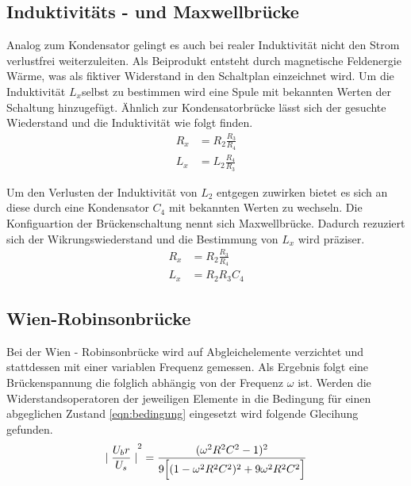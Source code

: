 \subsection{Induktivitäts - und Maxwellbrücke }
Analog zum Kondensator gelingt es auch bei realer Induktivität nicht den Strom verlustfrei weiterzuleiten.
Als Beiprodukt entsteht durch magnetische Feldenergie Wärme, was als fiktiver Widerstand in den Schaltplan einzeichnet wird.
Um die Induktivität $L_x$selbst zu bestimmen wird eine Spule mit bekannten Werten der Schaltung hinzugefügt. 
Ähnlich zur Kondensatorbrücke lässt sich der gesuchte Wiederstand und die Induktivität wie folgt finden.
\begin{align}
    R_x &= R_2\frac{R_3}{R_4} \\
    L_x &= L_2\frac{R_4}{R_3}
\end{align}

Um den Verlusten der Induktivität von $L_2$ entgegen zuwirken bietet es sich an diese durch eine Kondensator $C_4$ mit bekannten Werten
zu wechseln. Die Konfiguartion der Brückenschaltung nennt sich Maxwellbrücke.
Dadurch rezuziert sich der Wikrungswiederstand und die Bestimmung von $L_x$ wird präziser.
\begin{align}
    R_x &= R_2\frac{R_3}{R_4} \\
    L_x &= R_2R_3C_4
\end{align}

\subsection{Wien-Robinsonbrücke}
Bei der Wien - Robinsonbrücke wird auf Abgleichelemente verzichtet und stattdessen mit einer variablen Frequenz gemessen.
Als Ergebnis folgt eine Brückenspannung die folglich abhängig von der Frequenz $\omega$ ist.
Werden die Widerstandsoperatoren der jeweiligen Elemente 
in die Bedingung für einen abgeglichen Zustand \eqref{eqn:bedingung} eingesetzt wird folgende Glecihung gefunden.
\begin{equation} %
    {\mid \frac{U_br}{U_s} \mid }^2 = \frac{(\omega ^2 R^2 C^2 -1)^2}{9\Bigl[(1-\omega ^2 R^2 C^2)^2 + 9 \omega ^2 R^2 C^2 \Bigr]}
\end{equation}

















